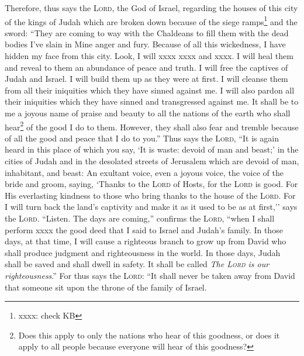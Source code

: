 
\begin{inparaenum}
     Therefore, thus says the \textsc{Lord}, the God of Israel, regarding the houses of this city of the kings of Judah which are broken down because of the siege ramps\footnote{xxxx: check KB} and the sword:%
     ``They are coming to way with the Chaldeans to fill them with the dead bodies I've slain in Mine anger and fury. Because of all this wickedness, I have hidden my face from this city.%
     Look, I will xxxx xxxx and xxxx. I will heal them and reveal to them an abundance of peace and truth.%
     I will free the captives of Judah and Israel. I will build them up as they were at first.%
     I will cleanse them from all their iniquities which they have sinned against me. I will also pardon all their iniquities which they have sinned and transgressed against me.%
     It shall be to me a joyous name of praise and beauty to all the nations of the earth who shall hear\footnote{Does this apply to only the nations who hear of this goodness, or does it apply to all people because everyone will hear of this goodness?} of the good I do to them. However, they shall also fear and tremble because of all the good and peace that I do to you.''%
     Thus says the \textsc{Lord}, ``It is again heard in this place of which you say, `It is waste: devoid of man and beast;' in the cities of Judah and in the desolated streets of Jerusalem which are devoid of man, inhabitant, and beast:%
     An exultant voice, even a joyous voice, the voice of the bride and groom, saying, `Thanks to the \textsc{Lord} of Hosts, for the \textsc{Lord} is good. For His everlasting kindness to those who bring thanks to the house of the \textsc{Lord}. For I will turn back the land's captivity and make it as it used to be as at first,'' says the \textsc{Lord}.%
     ``Listen. The days are coming,'' confirms the \textsc{Lord}, ``when I shall perform xxxx the good deed that I said to Israel and Judah's family.%
     In those days, at that time, I will cause a righteous branch to grow up from David who shall produce judgment and righteousness in the world.%
     In those days, Judah shall be saved and shall dwell in safety. It shall be called \textit{The \textsc{Lord} is our righteousness}.''%
     For thus says the \textsc{Lord}: ``It shall never be taken away from David that someone sit upon the throne of the family of Israel.%

\end{inparaenum}
